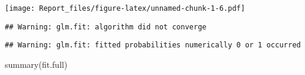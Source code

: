 \documentclass[
]{article}
\newenvironment{Shaded}{\begin{snugshade}}{\end{snugshade}}
\newcommand{\AttributeTok}[1]{\textcolor[rgb]{0.77,0.63,0.00}{#1}}
\newcommand{\FunctionTok}[1]{\textcolor[rgb]{0.00,0.00,0.00}{#1}}
\newcommand{\NormalTok}[1]{#1}
\newcommand{\OtherTok}[1]{\textcolor[rgb]{0.56,0.35,0.01}{#1}}
\newcommand{\SpecialCharTok}[1]{\textcolor[rgb]{0.00,0.00,0.00}{#1}}
\begin{document}
\texttt{[image: Report\_files/figure-latex/unnamed-chunk-1-6.pdf]}

\begin{Shaded}
\end{Shaded}

\begin{verbatim}
## Warning: glm.fit: algorithm did not converge
\end{verbatim}

\begin{verbatim}
## Warning: glm.fit: fitted probabilities numerically 0 or 1 occurred
\end{verbatim}

\begin{Shaded}
\begin{Highlighting}[]
\FunctionTok{summary}\NormalTok{(fit.full) }
\end{Highlighting}
\end{Shaded}
\end{document}
